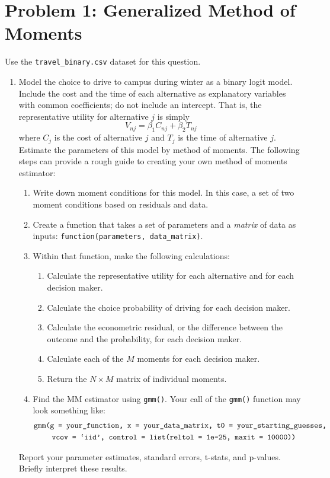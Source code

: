 \documentclass[11pt,letterpaper]{article}\usepackage[]{graphicx}\usepackage[]{color}
\begin{document}
\section*{Problem 1: Generalized Method of Moments}

Use the \texttt{travel\_binary.csv} dataset for this question.

\begin{enumerate}[label=\alph*., leftmargin=*]
	\item Model the choice to drive to campus during winter as a binary logit model. Include the cost and the time of each alternative as explanatory variables with common coefficients; do not include an intercept. That is, the representative utility for alternative $j$ is simply
	$$V_{nj} = \beta_1 C_{nj} + \beta_2 T_{nj}$$
	where $C_j$ is the cost of alternative $j$ and $T_j$ is the time of alternative $j$. Estimate the parameters of this model by method of moments. The following steps can provide a rough guide to creating your own method of moments estimator:
	\begin{enumerate}[label=\Roman*.]
		\item Write down moment conditions for this model. In this case, a set of two moment conditions based on residuals and data.
		\item Create a function that takes a set of parameters and a \emph{matrix} of data as inputs: \texttt{function(parameters, data\_matrix)}.
		\item Within that function, make the following calculations:
		\begin{enumerate}[label=\roman*.]
			\item Calculate the representative utility for each alternative and for each decision maker.
			\item Calculate the choice probability of driving for each decision maker.
			\item Calculate the econometric residual, or the difference between the outcome and the probability, for each decision maker.
			\item Calculate each of the $M$ moments for each decision maker.
			\item Return the $N \times M$ matrix of individual moments.
		\end{enumerate}
		\item Find the MM estimator using \texttt{gmm()}. Your call of the \texttt{gmm()} function may look something like:
		\begin{align*}
			&\text{\texttt{gmm(g = your\_function, x = your\_data\_matrix, t0 = your\_starting\_guesses, }} \\
			&\qquad~ \text{\texttt{vcov = `iid', control = list(reltol = 1e-25, maxit = 10000))}}
		\end{align*}
	\end{enumerate}
	Report your parameter estimates, standard errors, t-stats, and p-values. Briefly interpret these results.


\end{enumerate}
\end{document}
